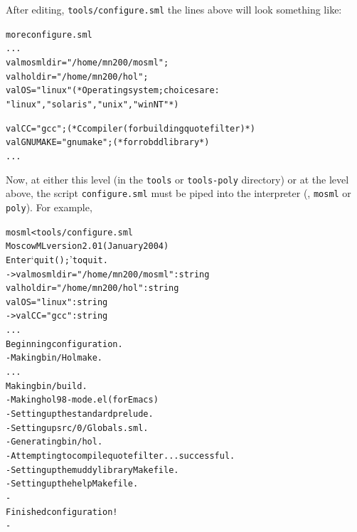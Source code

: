 After editing, \texttt{tools/configure.sml} the lines above will look
something like:

\begin{session}
\begin{alltt}
\dol more configure.sml
  ...
val mosmldir = "/home/mn200/mosml";
val holdir   = "/home/mn200/hol";
val OS       = "linux"       (* Operating system; choices are:
                                "linux", "solaris", "unix", "winNT" *)

val CC       = "gcc";     (* C compiler (for building quote filter)        *)
val GNUMAKE  = "gnumake"; (* for robdd library                             *)
  ...
\dol
\end{alltt}
\end{session}

\noindent Now, at either this level (in the \texttt{tools} or
\texttt{tools-poly} directory) or at the level above, the script
\texttt{configure.sml} must be piped into the \ML{} interpreter (\ie,
\texttt{mosml} or \texttt{poly}).  For example,

\begin{session}
\begin{alltt}
\dol mosml < tools/configure.sml
Moscow ML version 2.01 (January 2004)
Enter `quit();' to quit.
- > val mosmldir = "/home/mn200/mosml" : string
  val holdir = "/home/mn200/hol" : string
  val OS = "linux" : string
- > val CC = "gcc" : string
  ...
Beginning configuration.
- Making bin/Holmake.
  ...
Making bin/build.
- Making hol98-mode.el (for Emacs)
- Setting up the standard prelude.
- Setting up src/0/Globals.sml.
- Generating bin/hol.
- Attempting to compile quote filter ... successful.
- Setting up the muddy library Makefile.
- Setting up the help Makefile.
-
Finished configuration!
-
\dol
\end{alltt}
\end{session}



